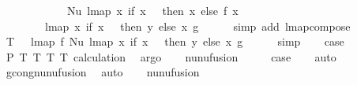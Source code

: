 \begin{isabellebody}
\ \ \ \ \ \ \ \ \ \ \ \ Nu\ {\isacharparenleft}{\kern0pt}lmap\ {\isacharparenleft}{\kern0pt}{\isasymlambda}x{\isachardot}{\kern0pt}\ if\ x\ {\isacharequal}{\kern0pt}\ {}\ then\ x\ else\ f\ {\isacharparenleft}{\kern0pt}x\ {\isacharminus}{\kern0pt}\ {}{\isacharparenright}{\kern0pt}\ {\isacharplus}{\kern0pt}\ {}{\isacharparenright}{\kern0pt}\isanewline
\ \ \ \ \ \ \ \ {\isacharparenleft}{\kern0pt}lmap\ {\isacharparenleft}{\kern0pt}{\isasymlambda}x{\isachardot}{\kern0pt}\ if\ x\ {\isacharequal}{\kern0pt}\ {}\ then\ y\ else\ x{\isacharparenright}{\kern0pt}\ g{\isacharparenright}{\kern0pt}{\isacharparenright}{\kern0pt}{\isachardoublequoteclose}\isanewline
\ \ \ \ \isamarkupfalse%
\ {\isacharparenleft}{\kern0pt}simp\ add{\isacharcolon}{\kern0pt}\ lmap{\isacharunderscore}{\kern0pt}compose{\isacharparenright}{\kern0pt}\isanewline
\ \ \isamarkupfalse%
\ T{}{\isacharcolon}{\kern0pt}\ {\isachardoublequoteopen}{\isachardot}{\kern0pt}{\isachardot}{\kern0pt}{\isachardot}{\kern0pt}\ {\isacharequal}{\kern0pt}\ lmap\ f\ {\isacharparenleft}{\kern0pt}Nu\ {\isacharparenleft}{\kern0pt}lmap\ {\isacharparenleft}{\kern0pt}{\isasymlambda}x{\isachardot}{\kern0pt}\ if\ x\ {\isacharequal}{\kern0pt}\ {}\ then\ y\ else\ x{\isacharparenright}{\kern0pt}\ g{\isacharparenright}{\kern0pt}{\isacharparenright}{\kern0pt}{\isachardoublequoteclose}\isanewline
\ \ \ \ \isamarkupfalse%
\ simp\isanewline
\ \ \isamarkupfalse%
\ {\isacharquery}{\kern0pt}case\isanewline
\ \ \ \ \isamarkupfalse%
\ P{}\ T{}\ T{}\ T{}\ T{}\ calculation\ \isamarkupfalse%
\ argo\isanewline
{}\isamarkupfalse%
\isanewline
\ \ \isamarkupfalse%
\ nu{\isacharunderscore}{\kern0pt}nu{\isacharunderscore}{\kern0pt}fusion{}\isanewline
\ \ \isamarkupfalse%
\ \isamarkupfalse%
\ {\isacharquery}{\kern0pt}case\isanewline
\ \ \isamarkupfalse%
\ auto\isanewline
\ \ \isamarkupfalse%
\ gcong{\isachardot}{\kern0pt}nu{\isacharunderscore}{\kern0pt}nu{\isacharunderscore}{\kern0pt}fusion{}\ \isamarkupfalse%
\ auto\isanewline
{}\isamarkupfalse%
\isanewline
\ \ \isamarkupfalse%
\ nu{\isacharunderscore}{\kern0pt}nu{\isacharunderscore}{\kern0pt}fusion{}\isanewline
\ \ \isamarkupfalse%

\end{isabellebody}
